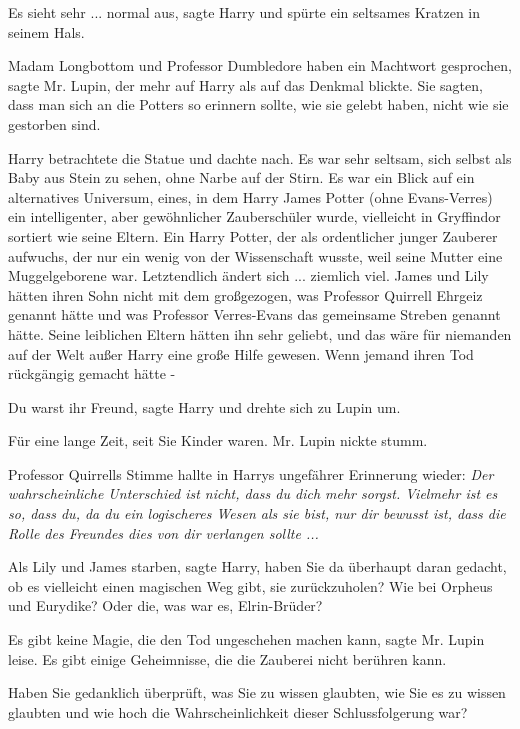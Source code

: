 \glqq{}Es sieht sehr ... normal aus\grqq{}, sagte Harry und spürte ein seltsames
Kratzen in seinem Hals.

\glqq{}Madam Longbottom und Professor Dumbledore haben ein Machtwort
gesprochen\grqq{}, sagte Mr. Lupin, der mehr auf Harry als auf das Denkmal
blickte. \glqq{}Sie sagten, dass man sich an die Potters so erinnern sollte, wie
sie gelebt haben, nicht wie sie gestorben sind.\grqq{}

Harry betrachtete die Statue und dachte nach. Es war sehr seltsam, sich selbst
als Baby aus Stein zu sehen, ohne Narbe auf der Stirn. Es war ein Blick auf ein
alternatives Universum, eines, in dem Harry James Potter (ohne Evans-Verres) ein
intelligenter, aber gewöhnlicher Zauberschüler wurde, vielleicht in Gryffindor
sortiert wie seine Eltern. Ein Harry Potter, der als ordentlicher junger
Zauberer aufwuchs, der nur ein wenig von der Wissenschaft wusste, weil seine
Mutter eine Muggelgeborene war. Letztendlich ändert sich ... ziemlich viel. James
und Lily hätten ihren Sohn nicht mit dem großgezogen, was Professor Quirrell
Ehrgeiz genannt hätte und was Professor Verres-Evans das gemeinsame Streben
genannt hätte. Seine leiblichen Eltern hätten ihn sehr geliebt, und das wäre für
niemanden auf der Welt außer Harry eine große Hilfe gewesen. Wenn jemand ihren
Tod rückgängig gemacht hätte -

\glqq{}Du warst ihr Freund\grqq{}, sagte Harry und drehte sich zu Lupin um.

\glqq{}Für eine lange Zeit, seit Sie Kinder waren.\grqq{} Mr. Lupin nickte stumm.

Professor Quirrells Stimme hallte in Harrys ungefährer Erinnerung wieder:
\emph{Der wahrscheinliche Unterschied ist nicht, dass du dich mehr sorgst.
Vielmehr ist es so, dass du, da du ein logischeres Wesen als sie bist, nur dir
bewusst ist, dass die Rolle des Freundes dies von dir verlangen sollte ...}

\glqq{}Als Lily und James starben\grqq{}, sagte Harry, \glqq{}haben Sie da
überhaupt daran gedacht, ob es vielleicht einen magischen Weg gibt, sie
zurückzuholen? Wie bei Orpheus und Eurydike? Oder die, was war es,
Elrin-Brüder?\grqq{}

\glqq{}Es gibt keine Magie, die den Tod ungeschehen machen kann\grqq{}, sagte Mr.
Lupin leise. \glqq{}Es gibt einige Geheimnisse, die die Zauberei nicht berühren
kann.\grqq{}

\glqq{}Haben Sie gedanklich überprüft, was Sie zu wissen glaubten, wie Sie es zu
wissen glaubten und wie hoch die Wahrscheinlichkeit dieser Schlussfolgerung
war?\grqq{}


